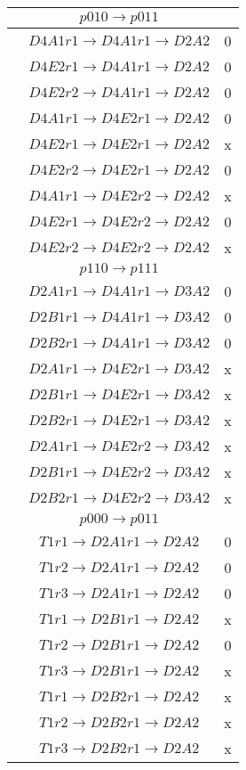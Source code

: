 \documentclass[10pt]{article}
\begin{document}
\begin{table}[!htbp]
\begin{minipage}[!htbp]{0.33\textwidth}
\begin{tabular}{ccc}
 &$p010 \rightarrow p011 $& \\ \hline
 & $D4A1 r1 \rightarrow D4A1 r1 \rightarrow D2A2$ & 0\\
 & $D4E2 r1 \rightarrow D4A1 r1 \rightarrow D2A2$ &  0\\
 & $D4E2 r2 \rightarrow D4A1 r1 \rightarrow D2A2$ &  0\\
 & $D4A1 r1 \rightarrow D4E2 r1 \rightarrow D2A2$ &  0\\
 & $D4E2 r1 \rightarrow D4E2 r1 \rightarrow D2A2$ &  x\\
 & $D4E2 r2 \rightarrow D4E2 r1 \rightarrow D2A2$ &  0\\
 & $D4A1 r1 \rightarrow D4E2 r2 \rightarrow D2A2$ &  x\\
 & $D4E2 r1 \rightarrow D4E2 r2 \rightarrow D2A2$ &  0\\
 & $D4E2 r2 \rightarrow D4E2 r2 \rightarrow D2A2$ &  x\\

\hline

 &$p110 \rightarrow p111 $& \\ \hline
 & $D2A1 r1 \rightarrow D4A1 r1 \rightarrow D3A2$ & 0\\
 & $D2B1 r1 \rightarrow D4A1 r1 \rightarrow D3A2$ &  0\\
 & $D2B2 r1 \rightarrow D4A1 r1 \rightarrow D3A2$ &  0\\
 & $D2A1 r1 \rightarrow D4E2 r1 \rightarrow D3A2$ &  x\\
 & $D2B1 r1 \rightarrow D4E2 r1 \rightarrow D3A2$ &  x\\
 & $D2B2 r1 \rightarrow D4E2 r1 \rightarrow D3A2$ &  x\\
 & $D2A1 r1 \rightarrow D4E2 r2 \rightarrow D3A2$ &  x\\
 & $D2B1 r1 \rightarrow D4E2 r2 \rightarrow D3A2$ &  x\\
 & $D2B2 r1 \rightarrow D4E2 r2 \rightarrow D3A2$ &  x\\

\hline

 &$p000 \rightarrow p011 $&\\  \hline
 & $T1 r1 \rightarrow D2A1 r1 \rightarrow D2A2$ & 0\\
 & $T1 r2 \rightarrow D2A1 r1 \rightarrow D2A2$ &  0\\
 & $T1 r3 \rightarrow D2A1 r1 \rightarrow D2A2$ &  0\\
 & $T1 r1 \rightarrow D2B1 r1 \rightarrow D2A2$ &  x\\
 & $T1 r2 \rightarrow D2B1 r1 \rightarrow D2A2$ &  0\\
 & $T1 r3 \rightarrow D2B1 r1 \rightarrow D2A2$ &  x\\
 & $T1 r1 \rightarrow D2B2 r1 \rightarrow D2A2$ &  x\\
 & $T1 r2 \rightarrow D2B2 r1 \rightarrow D2A2$ &  x\\
 & $T1 r3 \rightarrow D2B2 r1 \rightarrow D2A2$ &  x\\
 

\end{tabular}
\end{minipage}
\end{table}
\end{document}
